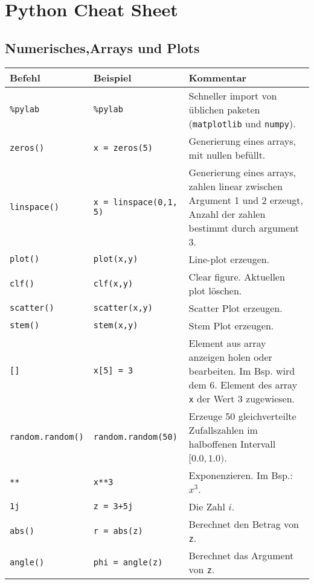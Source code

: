 

\section*{Python Cheat Sheet}
\subsection*{Numerisches,Arrays und Plots}
\begin{table}[H]
    \centering
    \begin{tabular}{|l|l|p{7cm}|}
        \hline
    \textbf{Befehl} & \textbf{Beispiel} & \textbf{Kommentar} \\ \hline
    
    \texttt{\%pylab} & \texttt{\%pylab} & Schneller import von üblichen paketen (\texttt{matplotlib} und \texttt{numpy}). \\ \hline
    \texttt{zeros()} & \texttt{x = zeros(5)} & Generierung eines arrays, mit nullen befüllt. \\ \hline
    \texttt{linspace()} & \texttt{x = linspace(0,1, 5)} & Generierung eines arrays, zahlen linear zwischen Argument 1 und 2 erzeugt, Anzahl der zahlen bestimmt durch argument 3. \\ \hline
    \texttt{plot()} & \texttt{plot(x,y)} & Line-plot erzeugen.  \\ \hline
    \texttt{clf()} & \texttt{clf(x,y)} & Clear figure. Aktuellen plot löschen.  \\ \hline
    \texttt{scatter()} & \texttt{scatter(x,y)} & Scatter Plot erzeugen. \\ \hline
    \texttt{stem()} & \texttt{stem(x,y)} & Stem Plot erzeugen. \\ \hline

    \texttt{[]} & \texttt{x[5] = 3} & Element aus array anzeigen holen oder bearbeiten. Im Bsp. wird dem 6. Element des array \texttt{x} der Wert 3 zugewiesen. \\ \hline
    \texttt{random.random()} & \texttt{random.random(50)} & Erzeuge 50 gleichverteilte Zufallszahlen im halboffenen Intervall $[0.0, 1.0)$. \\ \hline
    \texttt{**} & \texttt{x**3} & Exponenzieren. Im Bsp.: $x^3$. \\ \hline
    \texttt{1j} & \texttt{z = 3+5j} & Die Zahl $i$. \\ \hline
    \texttt{abs()} & \texttt{r = abs(z)} & Berechnet den Betrag von \texttt{z}. \\ \hline
    \texttt{angle()} & \texttt{phi = angle(z)} & Berechnet das Argument von \texttt{z}. \\ \hline

    \end{tabular}
\end{table}

